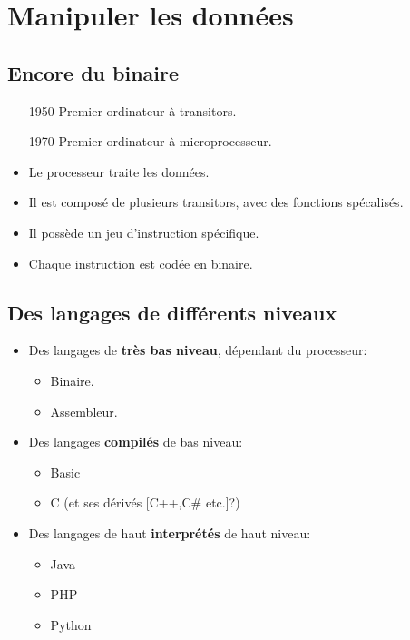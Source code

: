 \section{Manipuler les données}
\subsection{Encore du binaire}

\begin{slide}
	\begin{itemize}
		\item[1950] Premier ordinateur à transitors.
		\item[1970] Premier ordinateur à microprocesseur. %
	\end{itemize}
\end{slide}

\begin{slide}
	\begin{itemize}
		\item Le processeur traite les données.
		\item Il est composé de plusieurs transitors, avec des fonctions spécalisés.
		\item Il possède un jeu d'instruction spécifique.
		\item Chaque instruction est codée en binaire.
	\end{itemize}
\end{slide}

\subsection{Des langages de différents niveaux}

\begin{slide}
	\begin{itemize}
		\item Des langages de \textbf{très bas niveau}, dépendant du processeur:
		\begin{itemize}
			\item Binaire.
			\item Assembleur.
		\end{itemize}
		\item Des langages \textbf{compilés} de bas niveau:
		\begin{itemize}
			\item Basic
			\item C (et ses dérivés [C++,C\# etc.]?)
		\end{itemize}
		\item Des langages de haut \textbf{interprétés} de haut niveau:
		\begin{itemize}
			\item Java
			\item PHP
			\item Python
		\end{itemize}
	\end{itemize}
\end{slide}

